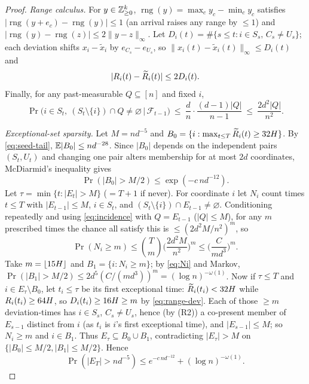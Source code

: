 \begin{proof}
\emph{Range calculus.} For $y\in\mathbb{Z}_{\ge0}^k$, $\operatorname{rng}(y)=\max_c y_c-\min_c y_c$ satisfies
$|\operatorname{rng}(y+e_c)-\operatorname{rng}(y)|\le 1$ (an arrival raises any range by $\le1$) and
$|\operatorname{rng}(y)-\operatorname{rng}(z)|\le 2\|y-z\|_\infty$. Let $D_i(t)=\#\{s\le t:i\in S_s,\,C_s\ne U_s\}$; each
deviation shifts $x_i-\widetilde x_i$ by $e_{C_s}-e_{U_s}$, so $\|x_i(t)-\widetilde x_i(t)\|_\infty\le D_i(t)$ and
\begin{equation}\label{eq:range-dev}
  |R_i(t)-\widetilde R_i(t)|\le 2D_i(t).
\end{equation}
Finally, for any past-measurable $Q\subseteq[n]$ and fixed $i$,
\begin{equation}\label{eq:incidence}
  \Pr\big(i\in S_t,\ (S_t\setminus\{i\})\cap Q\ne\varnothing\,\big|\,\mathcal F_{t-1}\big)\ \le\ \frac dn\cdot\frac{(d-1)|Q|}{n-1}\ \le\ \frac{2d^2|Q|}{n^2}.
\end{equation}

\emph{Exceptional-set sparsity.} Let $M=nd^{-5}$ and $B_0=\{i:\max_{t\le T}\widetilde R_i(t)\ge 32H\}$. By
\eqref{eq:seed-tail}, $\mathbb{E}|B_0|\le nd^{-28}$. Since $|B_0|$ depends on the independent pairs $(S_t,U_t)$ and changing one pair
alters membership for at most $2d$ coordinates, McDiarmid's inequality \cite{McDiarmid1989} gives
\begin{equation}\label{eq:B0}
  \Pr(|B_0|>M/2)\le\exp(-c\,nd^{-12}).
\end{equation}
Let $\tau=\min\{t:|E_t|>M\}$ ($=T+1$ if never). For coordinate $i$ let $N_i$ count times $t\le T$ with $|E_{t-1}|\le M$,
$i\in S_t$, and $(S_t\setminus\{i\})\cap E_{t-1}\ne\varnothing$. Conditioning repeatedly and using \eqref{eq:incidence} with
$Q=E_{t-1}$ ($|Q|\le M$), for any $m$ prescribed times the chance all satisfy this is $\le(2d^2M/n^2)^m$, so
\begin{equation}\label{eq:Ni}
  \Pr(N_i\ge m)\le\binom Tm\Big(\frac{2d^2M}{n^2}\Big)^m\le\Big(\frac{C}{m d^3}\Big)^m .
\end{equation}
Take $m=\lfloor 15H\rfloor$ and $B_1=\{i:N_i\ge m\}$; by \eqref{eq:Ni} and Markov,
$\Pr(|B_1|>M/2)\le 2d^5(C/(md^3))^m=(\log n)^{-\omega(1)}$. Now if $\tau\le T$ and $i\in E_\tau\setminus B_0$, let $t_i\le\tau$
be its first exceptional time: $\widetilde R_i(t_i)<32H$ while $R_i(t_i)\ge 64H$, so $D_i(t_i)\ge 16H\ge m$
by \eqref{eq:range-dev}. Each of those $\ge m$ deviation-times has $i\in S_s$, $C_s\ne U_s$, hence (by (R2)) a co-present
member of $E_{s-1}$ distinct from $i$ (as $t_i$ is $i$'s first exceptional time), and $|E_{s-1}|\le M$; so $N_i\ge m$ and
$i\in B_1$. Thus $E_\tau\subseteq B_0\cup B_1$, contradicting $|E_\tau|>M$ on $\{|B_0|\le M/2,|B_1|\le M/2\}$. Hence
\begin{equation}\label{eq:Esparse}
  \Pr(|E_T|>nd^{-5})\le e^{-c\,nd^{-12}}+(\log n)^{-\omega(1)}.
\end{equation}


\end{proof}
